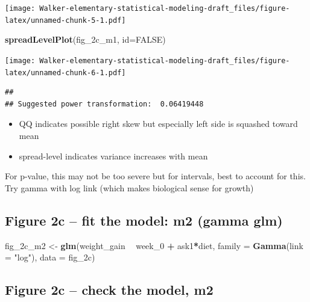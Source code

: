 \documentclass[]{book}
\newenvironment{Shaded}{\begin{snugshade}}{\end{snugshade}}
\newcommand{\DataTypeTok}[1]{\textcolor[rgb]{0.13,0.29,0.53}{#1}}
\newcommand{\DecValTok}[1]{\textcolor[rgb]{0.00,0.00,0.81}{#1}}
\newcommand{\KeywordTok}[1]{\textcolor[rgb]{0.13,0.29,0.53}{\textbf{#1}}}
\newcommand{\NormalTok}[1]{#1}
\newcommand{\OperatorTok}[1]{\textcolor[rgb]{0.81,0.36,0.00}{\textbf{#1}}}
\newcommand{\OtherTok}[1]{\textcolor[rgb]{0.56,0.35,0.01}{#1}}
\newcommand{\StringTok}[1]{\textcolor[rgb]{0.31,0.60,0.02}{#1}}
\providecommand{\tightlist}{%
  \setlength{\itemsep}{0pt}\setlength{\parskip}{0pt}}
\begin{document}
\texttt{[image: Walker-elementary-statistical-modeling-draft\_files/figure-latex/unnamed-chunk-5-1.pdf]}

\begin{Shaded}
\begin{Highlighting}[]
\KeywordTok{spreadLevelPlot}\NormalTok{(fig_2c_m1, }\DataTypeTok{id=}\OtherTok{FALSE}\NormalTok{)}
\end{Highlighting}
\end{Shaded}

\texttt{[image: Walker-elementary-statistical-modeling-draft\_files/figure-latex/unnamed-chunk-6-1.pdf]}

\begin{verbatim}
## 
## Suggested power transformation:  0.06419448
\end{verbatim}

\begin{itemize}
\tightlist
\item
  QQ indicates possible right skew but especially left side is squashed toward mean
\item
  spread-level indicates variance increases with mean
\end{itemize}

For p-value, this may not be too severe but for intervals, best to account for this. Try gamma with log link (which makes biological sense for growth)

\hypertarget{figure-2c-fit-the-model-m2-gamma-glm}{%
\subsection{Figure 2c -- fit the model: m2 (gamma glm)}\label{figure-2c-fit-the-model-m2-gamma-glm}}

\begin{Shaded}
\begin{Highlighting}[]
\NormalTok{fig_2c_m2 <-}\StringTok{ }\KeywordTok{glm}\NormalTok{(weight_gain }\OperatorTok{~}\StringTok{ }\NormalTok{week_}\DecValTok{0} \OperatorTok{+}\StringTok{ }\NormalTok{ask1}\OperatorTok{*}\NormalTok{diet,}
          \DataTypeTok{family =} \KeywordTok{Gamma}\NormalTok{(}\DataTypeTok{link =} \StringTok{"log"}\NormalTok{),}
          \DataTypeTok{data =}\NormalTok{ fig_2c)}
\end{Highlighting}
\end{Shaded}

\hypertarget{figure-2c-check-the-model-m2}{%
\subsection{Figure 2c -- check the model, m2}\label{figure-2c-check-the-model-m2}}
\end{document}
